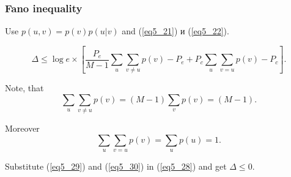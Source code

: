 \documentclass[14pt]{beamer}
\begin{document}
\begin{frame}
\frametitle{Fano inequality}
\begin{itemize}
    
    \item Use $p(u,v) = p(v)p(u\vert v)$ and (\ref{eq5_21}) и (\ref{eq5_22}).
    \footnotesize {
    \begin{equation}
    \label{eq5_28} \Delta \le \log e\times \left[ {\frac{P_e }{M -
    1}\sum\limits_u {\sum\limits_{v \ne u} {p(v) - P_e + } } P_c
    \sum\limits_u {\sum\limits_{v = u} {p(v) - P_c } } } \right].
    \end{equation}  
    
    
    \item Note, that 
    \begin{equation}
    \label{eq5_29} \sum\limits_u {\sum\limits_{v \ne u} {p(v) = (M - 1)\sum\limits_v {p(v) = (M - 1)} } } .
    \end{equation}

    \item Moreover 
    \begin{equation}
    \label{eq5_30} \sum\limits_u {\sum\limits_{v = u} {p(v) =
    \sum\limits_u {p(u) = 1} } } .
    \end{equation}

    \item Substitute (\ref{eq5_29}) and (\ref{eq5_30}) in (\ref{eq5_28}) and get $\Delta \le 0$. \QED

}
\end{itemize}
\end{frame}
\end{document}
